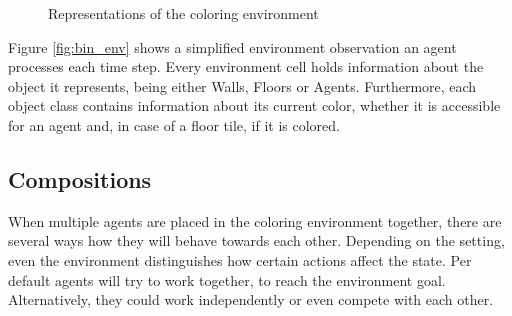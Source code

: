 \begin{figure}[hpbt]
    \centering
    \hspace{0.01\textwidth}
    \caption[Coloring Environment]{Representations of the coloring environment}
    \label{fig:multipic_env} %
\end{figure}

Figure \ref{fig:bin_env} shows a simplified environment observation an agent processes each time step. Every environment cell holds information about the object it represents, being either Walls, Floors or Agents. Furthermore, each object class contains information about its current color, whether it is accessible for an agent and, in case of a floor tile, if it is colored. 

\subsection{Compositions}
When multiple agents are placed in the coloring environment together, there are several ways how they will behave towards each other. Depending on the setting, even the environment distinguishes how certain actions affect the state. Per default agents will try to work together, to reach the environment goal. Alternatively, they could work independently or even compete with each other.


